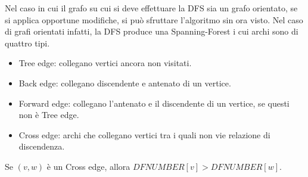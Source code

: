 \documentclass{subfiles}
\begin{document}
Nel caso in cui il grafo su cui si deve effettuare la DFS sia un grafo orientato, se si applica opportune modifiche, si può sfruttare l'algoritmo sin ora visto.
Nel caso di grafi orientati infatti, la DFS produce una Spanning-Forest i cui archi sono di quattro tipi.
\begin{itemize}
    \item Tree edge: collegano vertici ancora non visitati.
    \item Back edge: collegano discendente e antenato di un vertice.
    \item Forward edge: collegano l'antenato e il discendente di un vertice, se questi non è Tree edge.
    \item Cross edge: archi che collegano vertici tra i quali non vie relazione di discendenza.
\end{itemize}

\begin{Lemma}
    Se \((v, w)\) è un Cross edge, allora \(DFNUMBER[v] > DFNUMBER[w]\).
\end{Lemma}
\end{document}
